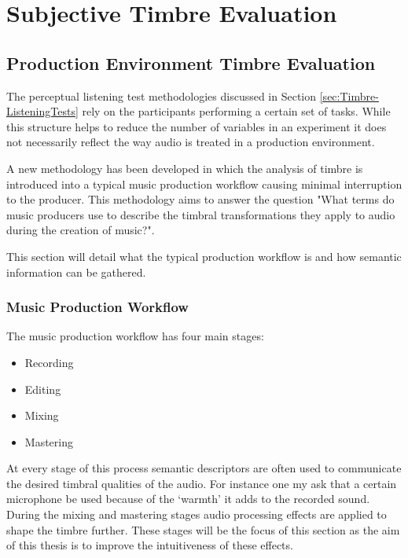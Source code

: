 \chapter{Subjective Timbre Evaluation}
\label{chap:ListeningTests}

\section{Production Environment Timbre Evaluation} %
\label{sec:ListeningTests-DAWBasedTimbreEvaluation}
The perceptual listening test methodologies discussed in Section \ref{sec:Timbre-ListeningTests} rely on the participants
performing a certain set of tasks. While this structure helps to reduce the number of variables in an experiment it does not
necessarily reflect the way audio is treated in a production environment.

A new methodology has been developed in which the analysis of timbre is introduced into a typical music production workflow
causing minimal interruption to the producer. This methodology aims to answer the question "What terms do music producers
use to describe the timbral transformations they apply to audio during the creation of music?". 

This section will detail what the typical production workflow is and how semantic information can be gathered.

	\subsection{Music Production Workflow}

		The music production workflow has four main stages:

		\begin{itemize}
			\item Recording
			\item Editing
			\item Mixing
			\item Mastering
		\end{itemize}

		At every stage of this process semantic descriptors are often used to communicate the desired timbral
		qualities of the audio. For instance one my ask that a certain microphone be used because of the `warmth' it
		adds to the recorded sound. During the mixing and mastering stages audio processing effects are applied to
		shape the timbre further.  These stages will be the focus of this section as the aim of this thesis is to
		improve the intuitiveness of these effects.

